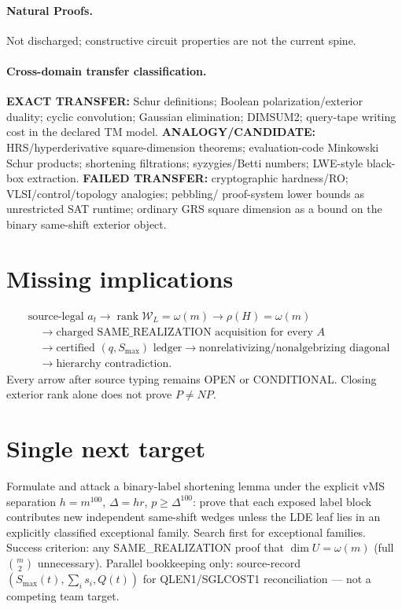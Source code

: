 \documentclass[11pt]{article}
\begin{document}
\paragraph{Natural Proofs.}
Not discharged; constructive circuit properties are not the current spine.
\paragraph{Cross-domain transfer classification.}
\textbf{EXACT TRANSFER:} Schur definitions; Boolean polarization/exterior duality; cyclic convolution;
Gaussian elimination; DIMSUM2; query-tape writing cost in the declared TM model.
\textbf{ANALOGY/CANDIDATE:} HRS/hyperderivative square-dimension theorems; evaluation-code Minkowski
Schur products; shortening filtrations; syzygies/Betti numbers; LWE-style black-box extraction.
\textbf{FAILED TRANSFER:} cryptographic hardness/RO; VLSI/control/topology analogies; pebbling/
proof-system lower bounds as unrestricted SAT runtime; ordinary GRS square dimension as a bound
on the binary same-shift exterior object.

\section*{Missing implications}
\[
\begin{aligned}
&\text{source-legal }a_t
\to \operatorname{rank}\mathcal W_L=\omega(m)
\to \rho(H)=\omega(m)\\
&\quad\to\text{charged SAME\_REALIZATION acquisition for every }A\\
&\quad\to\text{certified }(q,S_{\max})\text{ ledger}
\to\text{nonrelativizing/nonalgebrizing diagonal}\\
&\quad\to\text{hierarchy contradiction}.
\end{aligned}
\]
Every arrow after source typing remains OPEN or CONDITIONAL. Closing exterior rank alone does
not prove $P\neq NP$.

\section*{Single next target}
Formulate and attack a binary-label shortening lemma under the explicit vMS separation
$h=m^{100}$, $\Delta=hr$, $p\ge\Delta^{100}$: prove that each exposed label block contributes
new independent same-shift wedges unless the LDE leaf lies in an explicitly classified exceptional
family. Search first for exceptional families. Success criterion: any SAME\_REALIZATION proof that
$\dim U=\omega(m)$ (full $\binom{m}{2}$ unnecessary). Parallel bookkeeping only: source-record
$(S_{\max}(t),\sum_i s_i,Q(t))$ for QLEN1/SGLCOST1 reconciliation --- not a competing team target.
\end{document}
